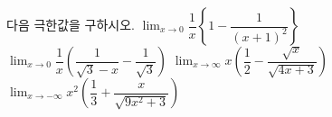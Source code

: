 다음 극한값을 구하시오.
 $\displaystyle\lim_{x\to 0}\dfrac{1}{x}\left\{1-\dfrac{1}{(x+1)^2}\right\}$
 $\displaystyle\lim_{x\to 0}\dfrac{1}{x}\left(\dfrac{1}{\sqrt{3}-x}-\dfrac{1}{\sqrt{3}}\right)$
 $\displaystyle\lim_{x\to\infty} x\left(\dfrac{1}{2}-\dfrac{\sqrt{x}}{\sqrt{4x+3}}\right)$
 $\displaystyle\lim_{x\to -\infty} x^2\left(\dfrac{1}{3}+\dfrac{x}{\sqrt{9x^2+3}}\right)$
